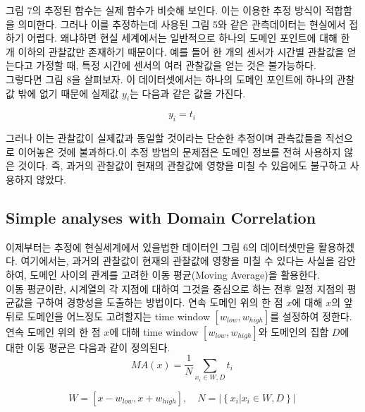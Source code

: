 \documentclass[a4paper]{oblivoir}
\begin{document}
그림 7의 추정된 함수는 실제 함수가 비슷해 보인다. 이는 이용한 추정 방식이 적합함을 의미한다. 그러나 이를 추정하는데 사용된 그림 5와 같은 관측데이터는 현실에서 접하기 어렵다. 왜냐하면 현실 세계에서는 일반적으로 하나의 도메인 포인트에 대해 한 개 이하의 관찰값만 존재하기 때문이다. 예를 들어 한 개의 센서가 시간별 관찰값을 얻는다고 가정할 때, 특정 시간에 센서의 여러 관찰값을 얻는 것은 불가능하다.\\
그렇다면 그림 8을 살펴보자. 이 데이터셋에서는 하나의 도메인 포인트에 하나의 관찰값 밖에 없기 때문에 실제값 $y_{i}$는 다음과 같은 값을 가진다.

\begin{equation}
y_{i} = t_{i}\
\label{eq:12-5}
\end{equation} 
 
그러나 이는 관찰값이 실제값과 동일할 것이라는 단순한 추정이며 관측값들을 직선으로 이어놓은 것에 불과하다.이 추정 방법의 문제점은 도메인 정보를 전혀 사용하지 않은 것이다. 즉, 과거의 관찰값이 현재의 관찰값에 영향을 미칠 수 있음에도 불구하고 사용하지 않았다.\\

\subsection{Simple analyses with Domain Correlation }

이제부터는 추정에 현실세계에서 있을법한 데이터인 그림 6의 데이터셋만을 활용하겠다. 여기에서는, 과거의 관찰값이 현재의 관찰값에 영향을 미칠 수 있다는 사실을 감안하여, 도메인 사이의 관계를 고려한 이동 평균(Moving Average)을 활용한다.\\
이동 평균이란, 시계열의 각 지점에 대하여 그것을 중심으로 하는 전후 일정 지점의 평균값을 구하여 경향성을 도출하는 방법이다. 연속 도메인 위의 한 점 $x$에 대해 $x$의 앞 뒤로 도메인을 어느정도 고려할지는 time window $[w_{low}, w_{high}]$를 설정하여 정한다. 연속 도메인 위의 한 점 $x$에 대해 time window $[w_{low}, w_{high}]$와 도메인의 집합 $D$에 대한 이동 평균은 다음과 같이 정의된다.\\

\begin{equation}
MA(x) = \frac{1}{N}\sum_{x_{i}\in W,D}t_{i}\
\label{eq:12-6}
\end{equation} 

\begin{equation}
W= [x - w_{low}, x+w_{high}], \quad  N= |\left\{x_{i}|x_{i} \in W,D \right\}| \
\label{eq:10-2-3}
\end{equation} 
\end{document}
